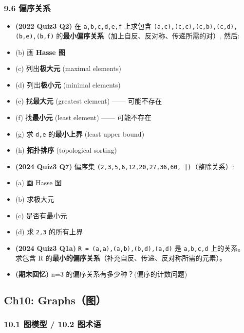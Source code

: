 \documentclass[10pt,a4paper,openany]{ctexbook}
\theoremstyle{definition}
\theoremstyle{remark}
\begin{document}
\subsubsection{9.6 偏序关系}

\begin{itemize}
\item \textbf{(2022 Quiz3 Q2)} 在 \texttt{{a,b,c,d,e,f}} 上求包含 \texttt{(a,c),(c,c),(c,b),(c,d),(b,e),(b,f)} 的\textbf{最小偏序关系}（加上自反、反对称、传递所需的对）, 然后:
\item (b) 画 \textbf{Hasse 图}
\item (c) 列出\textbf{极大元} (maximal elements)
\item (d) 列出\textbf{极小元} (minimal elements)
\item (e) 找\textbf{最大元} (greatest element) —— 可能不存在
\item (f) 找\textbf{最小元} (least element) —— 可能不存在
\item (g) 求 \texttt{{d,e}} 的\textbf{最小上界} (least upper bound)
\item (h) \textbf{拓扑排序} (topological sorting)

\item \textbf{(2024 Quiz3 Q7)} 偏序集 \texttt{({2,3,5,6,12,20,27,36,60}, |)}（整除关系）:
\item (a) 画 Hasse 图
\item (b) 求极大元
\item (c) 是否有最小元
\item (d) 求 \texttt{{2,3}} 的所有上界

\item \textbf{(2024 Quiz3 Q1a)} \texttt{R = {(a,a),(a,b),(b,d),(a,d)}} 是 \texttt{{a,b,c,d}} 上的关系。求包含 R 的\textbf{最小的偏序关系}（补充自反、传递、反对称所需的元素）。

\item \textbf{(期末回忆)} n=3 的偏序关系有多少种？(偏序的计数问题)

\end{itemize}

\vspace{-2pt}

\subsection{Ch10: Graphs（图）}

\subsubsection{10.1 图模型 / 10.2 图术语}
\end{document}
